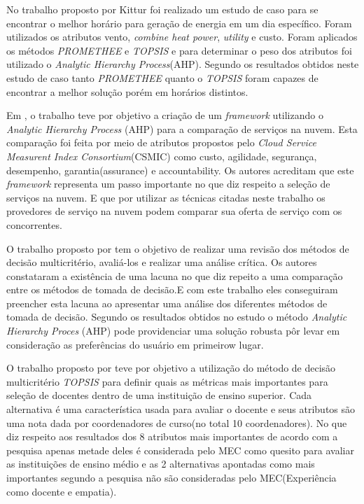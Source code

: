 \documentclass[openany, a4paper,12pt, oneside]{article}
\begin{document}

No trabalho proposto por Kittur \cite{Javeed} foi realizado um estudo de caso para se encontrar
o melhor horário para geração de energia em um dia específico. Foram utilizados os atributos vento, \textit{combine heat power}, \textit{utility} e custo. Foram aplicados os métodos \textit{PROMETHEE} e \textit{TOPSIS} e para determinar o peso dos atributos foi utilizado o \textit{Analytic Hierarchy Process}(AHP).
Segundo os resultados obtidos neste estudo de caso tanto \textit{PROMETHEE} quanto o \textit{TOPSIS} foram capazes de encontrar a melhor solução porém em horários distintos.

Em \cite{Saurabh}, o trabalho teve por objetivo a criação de um \textit{framework} utilizando o
\textit{Analytic Hierarchy Process} (AHP) para a comparação de serviços na nuvem. Esta comparação
foi feita por meio de atributos propostos pelo \textit{Cloud Service Measurent Index Consortium}(CSMIC)
como custo, agilidade, segurança, desempenho, garantia(assurance) e accountability. Os autores acreditam
que este \textit{framework} representa um passo  importante no que diz respeito a seleção de serviços
na nuvem. E que por utilizar as técnicas citadas neste trabalho os provedores de serviço na nuvem podem
comparar sua oferta de serviço com os concorrentes.

O trabalho proposto por \cite{SABAEI} tem o objetivo de realizar uma revisão dos métodos de decisão
multicritério, avaliá-los e realizar uma análise crítica. Os autores constataram a existência de
uma lacuna no que diz repeito a uma comparação entre os métodos de tomada de decisão.E com este
trabalho eles conseguiram preencher esta lacuna ao apresentar uma análise dos diferentes métodos
de tomada de decisão. Segundo os resultados obtidos no estudo o método \textit{Analytic Hierarchy Proces} (AHP)
pode providenciar uma solução robusta pôr levar em consideração as preferências do usuário em primeirow lugar.

O trabalho proposto por \cite{Arese} teve por objetivo a utilização do método de decisão multicritério \textit{TOPSIS} para definir quais as métricas mais importantes para seleção de docentes dentro de uma instituição de ensino superior. Cada alternativa é uma característica usada para avaliar o docente e seus atributos são uma nota dada por coordenadores de curso(no total 10 coordenadores). No que diz respeito aos resultados dos 8 atributos mais importantes de acordo com a pesquisa apenas metade deles é considerada pelo MEC como quesito para avaliar as instituições de ensino médio e as 2 alternativas apontadas como mais importantes segundo a pesquisa não são consideradas pelo MEC(Experiência como docente e empatia).
\end{document}
